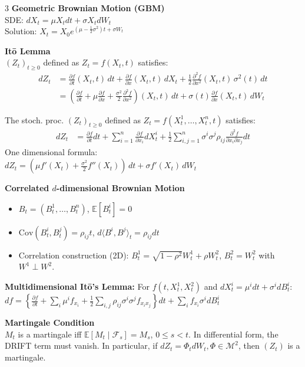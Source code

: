 \documentclass[8pt, a4paper, landscape]{extarticle}
\newcommand{\E}{\mathbb{E}}
\newcommand{\df}[2]{\frac{\partial #1}{\partial #2}}
\begin{document}
\begin{multicols*}{3}
\textbf{Geometric Brownian Motion (GBM)} \\
SDE: $dX_t = \mu X_t dt + \sigma X_t dW_t$ \\
Solution: $X_t = X_0 e^{(\mu - \frac{1}{2}\sigma^2)t + \sigma W_t}$

\textbf{Itō Lemma}\\
$(Z_t)_{t \ge 0}$ defined as $Z_t = f(X_t, t)$ satisfies:
\begin{align*}
dZ_t &= \df{f}{t}(X_t, t) \, dt + \df{f}{x}(X_t, t) \, dX_t + \frac{1}{2} \frac{\partial^2 f}{\partial x^2}(X_t, t) \, \sigma^2(t) \, dt \\
&= \left( \df{f}{t} + \mu \df{f}{x} + \frac{\sigma^2}{2} \frac{\partial^2 f}{\partial x^2} \right)(X_t, t) \, dt + \sigma(t) \df{f}{x}(X_t, t) \, dW_t
\end{align*}

The stoch. proc. $(Z_t)_{t \ge 0}$ defined as $Z_t = f(X_t^1, \dots, X_t^n, t)$ satisfies:
\begin{align*}
dZ_t &= \df{f}{t} dt + \sum_{i=1}^n \df{f}{x_i} dX_t^i + \frac{1}{2} \sum_{i,j=1}^n \sigma^i \sigma^j \rho_{ij} \frac{\partial^2 f}{\partial x_i \partial x_j} dt
\end{align*}
One dimensional formula: \\
$dZ_t = \left( \mu f'(X_t) + \frac{\sigma^2}{2} f''(X_t) \right) \, dt + \sigma f'(X_t) \, dW_t$

\textbf{Correlated $d$-dimensional Brownian Motion}
\begin{itemize}
    \item $B_t = (B_t^1, \dots, B_t^n)$, $\E[B_t^i]=0$
    \item $\text{Cov}(B_t^i, B_t^j) = \rho_{ij} t$, $d\langle B^i, B^j \rangle_t = \rho_{ij} dt$
    \item Correlation construction (2D): $B_t^1 = \sqrt{1-\rho^2} W_t^1 + \rho W_t^2$, $B_t^2 = W_t^2$ with $W^1 \perp W^2$.
\end{itemize}

\textbf{Multidimensional Itō's Lemma:} For $f(t, X_t^1, X_t^2)$ and $dX_t^i = \mu^i dt + \sigma^i dB_t^i$:
$df = \left\{ \df{f}{t} + \sum_i \mu^i f_{x_i} + \frac{1}{2} \sum_{i,j} \rho_{ij} \sigma^i \sigma^j f_{x_i x_j} \right\} dt + \sum_i f_{x_i} \sigma^i dB_t^i$

\textbf{Martingale Condition}\\
$M_t$ is a martingale iff $\E[M_t \mid \mathcal{F}_s] = M_s$, $0 \le s < t$.
In differential form, the DRIFT term must vanish.
In particular, if $dZ_t = \Phi_t dW_t, \Phi \in \mathcal{M}^2$, then $(Z_t)$ is a martingale.


\end{multicols*}
\end{document}
